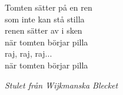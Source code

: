 \vspace{10pt}
Tomten sätter på en ren\\
som inte kan stå stilla\\
renen sätter av i sken\\
när tomten börjar pilla\\
raj, raj, raj...\\
när tomten börjar pilla\par
\vspace{10pt}
{\footnotesize\textit{Stulet från Wijkmanska Blecket}}
